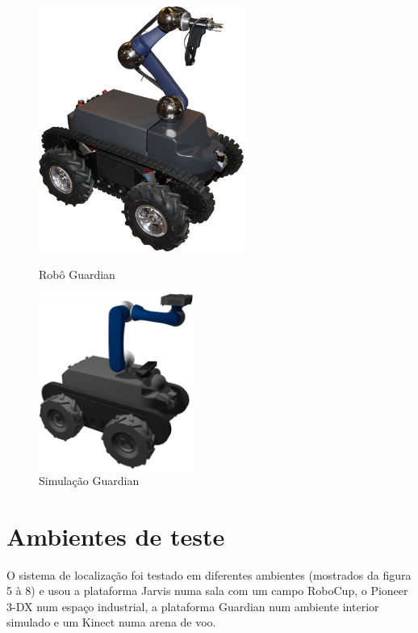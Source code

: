 \documentclass[9pt,a4paper]{extarticle}
\begin{document}
\begin{multicols}{2}
\vspace{-9pt}
\begin{figure}[H]
	\centering
	\begin{minipage}[b]{0.2\textwidth}
		\centering
		\includegraphics[width=0.6\textwidth]{guardian}
		\caption{\small Robô Guardian}
		\label{fig:guardian}
	\end{minipage}\hfill
	\begin{minipage}[b]{0.25\textwidth}
		\centering
		\includegraphics[width=0.45\textwidth]{guardian-gazebo}
		\caption{\small Simulação Guardian}
		\label{fig:guardian-gazebo}
	\end{minipage}
\end{figure}


\section{Ambientes de teste}

O sistema de localização foi testado em diferentes ambientes (mostrados da figura 5 à 8) e usou a plataforma Jarvis numa sala com um campo RoboCup, o Pioneer 3-DX num espaço industrial, a plataforma Guardian num ambiente interior simulado e um Kinect numa arena de voo.



\end{multicols}
\end{document}
